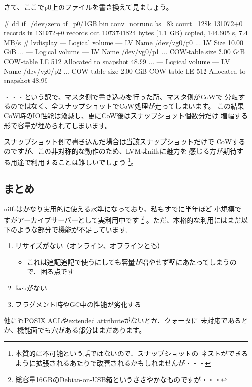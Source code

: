 \documentclass[mingoth,a4paper]{jsarticle}
\begin{document}
さて、ここでp0上のファイルを書き換えて見ましょう。
\begin{commandline}
# dd if=/dev/zero of=p0/1GB.bin conv=notrunc bs=8k count=128k
131072+0 records in
131072+0 records out
1073741824 bytes (1.1 GB) copied, 144.605 s, 7.4 MB/s
# lvdisplay
--- Logical volume ---
LV Name                /dev/vg0/p0
...
LV Size                10.00 GiB
...
--- Logical volume ---
LV Name                /dev/vg0/p1
...
COW-table size         2.00 GiB
COW-table LE           512
Allocated to snapshot  48.99%
...
--- Logical volume ---
LV Name                /dev/vg0/p2
...
COW-table size         2.00 GiB
COW-table LE           512
Allocated to snapshot  48.99%
\end{commandline}
・・・という訳で、マスタ側で書き込みを行った所、マスタ側がCoWで
分岐するのではなく、全スナップショットでCoW処理が走ってしまいます。
この結果CoW時のIO性能は激減し、更にCoW後はスナップショット個数分だけ
増幅する形で容量が埋められてしまいます。

スナップショット側で書き込んだ場合は当該スナップショットだけで
CoWするのですが、この非対称的な動作のため、LVMはnilfsに魅力を
感じる方が期待する用途で利用することは難しいでしょう
\footnote{本質的に不可能という話ではないので、スナップショットの
ネストができるように拡張されるあたりで改善されるかもしれませんが・・・}。

\subsection{まとめ}
nilfsはかなり実用的に使える水準になっており、私もすでに半年ほど
小規模ですがアーカイブサーバーとして実利用中です
\footnote{総容量16GBのDebian-on-USB箱というささやかなものですが・・・}
。ただ、本格的な利用にはまだ以下のような部分で機能が不足しています。
\begin{enumerate}
\item リサイズがない（オンライン、オフラインとも）
\begin{itemize}
\item これは追記追記で使うにしても容量が増やせず壁にあたってしまうので、困る点です
\end{itemize}
\item fsckがない
\item フラグメント時やGC中の性能が劣化する
\end{enumerate}
他にもPOSIX ACLやextended attributeがないとか、クォータに
未対応であるとか、機能面でも穴がある部分はまだあります。
\end{document}

